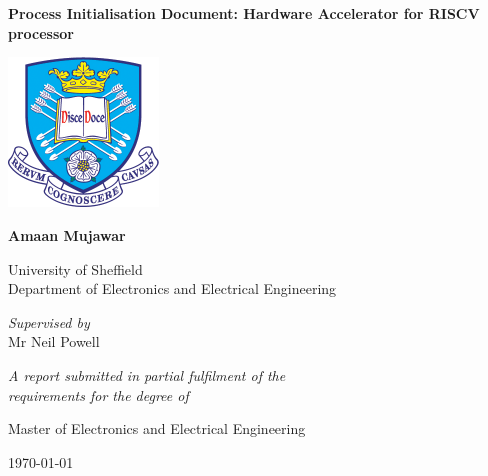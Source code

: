 \documentclass[11pt,oneside]{book}
\begin{document}
    \centering
    \vspace*{1.5cm}

    {\Huge\bfseries Process Initialisation Document: Hardware Accelerator for RISCV processor\par}
    \vspace{2.5cm}
    \includegraphics[width=0.3\textwidth]{images/logo.png}\par
    \vspace{2.5cm}

    {\Large\bfseries Amaan Mujawar\par}
    \vspace{0.5cm}
    {University of Sheffield\\}
    {Department of Electronics and Electrical Engineering}
    \vfill

    \textit{Supervised by\\}
    Mr Neil Powell
    \vfill

    \textit{A report submitted in partial fulfilment of the\\
    requirements for the degree of}\par
    {Master of Electronics and Electrical Engineering}
    \vspace{0.5cm}

    {\large\today}
\end{document}
